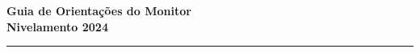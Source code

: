\thispagestyle{mystyle}

\vspace{0.75cm}
\begin{center}
    {\Large \textbf{Guia de Orientações do Monitor}} \\
    {\Large \textbf{Nivelamento 2024}} \\

\vspace{0.25cm}

    \rule{\linewidth}{0.5mm}
\end{center}
